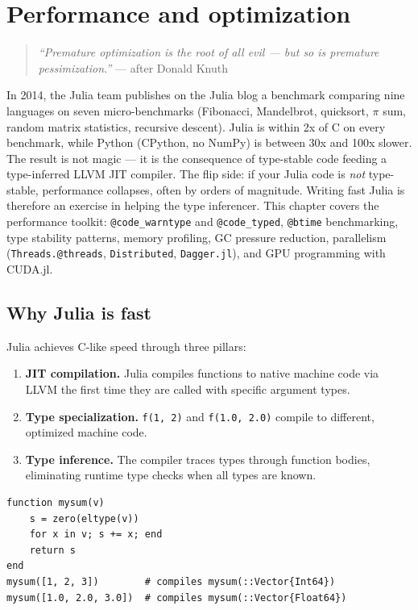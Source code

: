 \chapter{Performance and optimization}
\label{ch:performance}

\begin{quote}
\emph{``Premature optimization is the root of all evil --- but so is premature pessimization.''}
--- after Donald Knuth
\end{quote}

In 2014, the Julia team publishes on the Julia blog a benchmark comparing nine languages on seven micro-benchmarks (Fibonacci, Mandelbrot, quicksort, $\pi$ sum, random matrix statistics, recursive descent). Julia is within 2x of C on every benchmark, while Python (CPython, no NumPy) is between 30x and 100x slower. The result is not magic --- it is the consequence of type-stable code feeding a type-inferred LLVM JIT compiler. The flip side: if your Julia code is \emph{not} type-stable, performance collapses, often by orders of magnitude. Writing fast Julia is therefore an exercise in helping the type inferencer. This chapter covers the performance toolkit: \texttt{@code\_warntype} and \texttt{@code\_typed}, \texttt{@btime} benchmarking, type stability patterns, memory profiling, GC pressure reduction, parallelism (\texttt{Threads.@threads}, \texttt{Distributed}, \texttt{Dagger.jl}), and GPU programming with CUDA.jl.

\section{Why Julia is fast}

Julia achieves C-like speed through three pillars:

\begin{enumerate}
  \item \textbf{JIT compilation.} Julia compiles functions to native machine code via LLVM the first time they are called with specific argument types.
  \item \textbf{Type specialization.} \texttt{f(1, 2)} and \texttt{f(1.0, 2.0)} compile to different, optimized machine code.
  \item \textbf{Type inference.} The compiler traces types through function bodies, eliminating runtime type checks when all types are known.
\end{enumerate}

\begin{verbatim}
function mysum(v)
    s = zero(eltype(v))
    for x in v; s += x; end
    return s
end
mysum([1, 2, 3])        # compiles mysum(::Vector{Int64})
mysum([1.0, 2.0, 3.0])  # compiles mysum(::Vector{Float64})
\end{verbatim}

